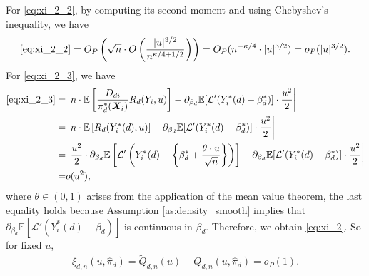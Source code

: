 \documentclass[11pt]{article}
\numberwithin{equation}{section}
\begin{document}
For \eqref{eq:xi_2_2}, by computing its second moment and using Chebyshev's inequality, we have
\begin{align*}
	\eqref{eq:xi_2_2}=O_P\left(\sqrt{n}\cdot O\left(\frac{|u|^{3/2}}{n^{\kappa/4+1/2}}\right) \right)=O_P(n^{-\kappa/4}\cdot |u|^{3/2})=o_P(|u|^{3/2}).
\end{align*}
For \eqref{eq:xi_2_3}, we have
\begin{align*}
	\eqref{eq:xi_2_3}=&\left|n\cdot\mathbb{E}\left[\frac{D_{di}}{{\pi}^*_d(\boldsymbol{X}_{i})}R_d(Y_i,u)\right]-\partial_{\beta_d}\mathbb{E}[\mathcal{L}'(Y^*_i(d)-\beta_d^*)]\cdot \frac{u^2}{2} \right|\\
	=&\left|n\cdot\mathbb{E}\left[R_d(Y^*_i(d),u)\right]-\partial_{\beta_d}\mathbb{E}[\mathcal{L}'(Y^*_i(d)-\beta_d^*)]\cdot \frac{u^2}{2} \right|\\
	=&\left|\frac{u^2}{2}\cdot \partial_{\beta_d}\mathbb{E}\left[\mathcal{L}'\left(Y_i^*(d)-\left\{\beta_d^*+\frac{\theta\cdot u}{\sqrt{n}}\right\}\right)\right]-\partial_{\beta_d}\mathbb{E}[\mathcal{L}'(Y^*_i(d)-\beta_d^*)]\cdot \frac{u^2}{2}\right| \\
	=&o(u^2),
\end{align*}
where $\theta\in (0,1)$ arises from the application of the mean value theorem, the last equality holds because Assumption \ref{as:density_smooth} implies that  $\partial_{\beta_d}\mathbb{E}[\mathcal{L}'(Y^*_i(d)-\beta_d)]$ is continuous in $\beta_d$.  Therefore, we obtain \eqref{eq:xi_2}. So for fixed $u$,
\begin{align}\label{eq:Qtilde-Q}
	\xi_{d,n}(u,\widehat{\pi}_d)=\widetilde{Q}_{d,n}(u)-Q_{d,n}(u,\widehat{\pi}_d)=o_P(1).
\end{align}
\end{document}
